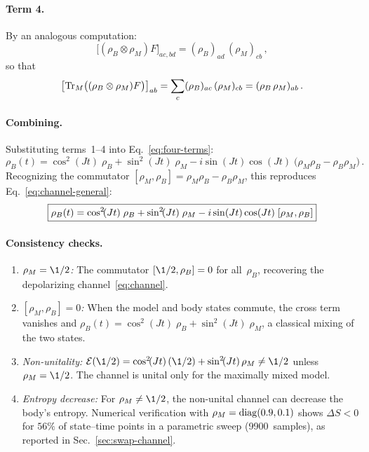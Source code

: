 \paragraph{Term 4.}
By an analogous computation:
\begin{equation}
  \bigl[(\rho_B \otimes \rho_M)F\bigr]_{ac,bd}
  = (\rho_B)_{ad}\,(\rho_M)_{cb} \,,
  \label{eq:term4-index}
\end{equation}
so that
\begin{equation}
  \bigl[\operatorname{Tr}_M\bigl((\rho_B \otimes \rho_M)F\bigr)\bigr]_{ab}
  = \sum_c (\rho_B)_{ac}\,(\rho_M)_{cb}
  = (\rho_B\,\rho_M)_{ab} \,.
  \label{eq:term4-trace}
\end{equation}

\paragraph{Combining.}
Substituting terms~1--4 into Eq.~\eqref{eq:four-terms}:
\begin{equation}
  \rho_B(t) = \cos^2\!(Jt)\;\rho_B + \sin^2\!(Jt)\;\rho_M
    - i\sin(Jt)\cos(Jt)\;\bigl(\rho_M\rho_B - \rho_B\rho_M\bigr) \,.
  \label{eq:general-result}
\end{equation}
Recognizing the commutator $[\rho_M, \rho_B] = \rho_M\rho_B
- \rho_B\rho_M$, this reproduces Eq.~\eqref{eq:channel-general}:
\begin{equation}
  \boxed{%
    \rho_B(t) = \cos^2\!(Jt)\;\rho_B + \sin^2\!(Jt)\;\rho_M
    - i\sin(Jt)\cos(Jt)\;[\rho_M, \rho_B]
  }
  \label{eq:general-boxed}
\end{equation}

\paragraph{Consistency checks.}
\begin{enumerate}
  \item \textit{$\rho_M = \1/2$:}
    The commutator $[\1/2, \rho_B] = 0$ for all~$\rho_B$,
    recovering the depolarizing channel~\eqref{eq:channel}.
  \item \textit{$[\rho_M, \rho_B] = 0$:}
    When the model and body states commute, the cross term vanishes and
    $\rho_B(t) = \cos^2\!(Jt)\;\rho_B + \sin^2\!(Jt)\;\rho_M$,
    a classical mixing of the two states.
  \item \textit{Non-unitality:}
    $\mathcal{E}(\1/2) = \cos^2\!(Jt)\,(\1/2) + \sin^2\!(Jt)\,\rho_M
    \neq \1/2$ unless $\rho_M = \1/2$.  The channel is unital only
    for the maximally mixed model.
  \item \textit{Entropy decrease:}
    For $\rho_M \neq \1/2$, the non-unital channel can decrease the
    body's entropy.  Numerical verification with $\rho_M =
    \operatorname{diag}(0.9, 0.1)$ shows $\Delta S < 0$ for $56\%$ of state--time
    points in a parametric sweep (9900~samples), as reported in
    Sec.~\ref{sec:swap-channel}.
\end{enumerate}
